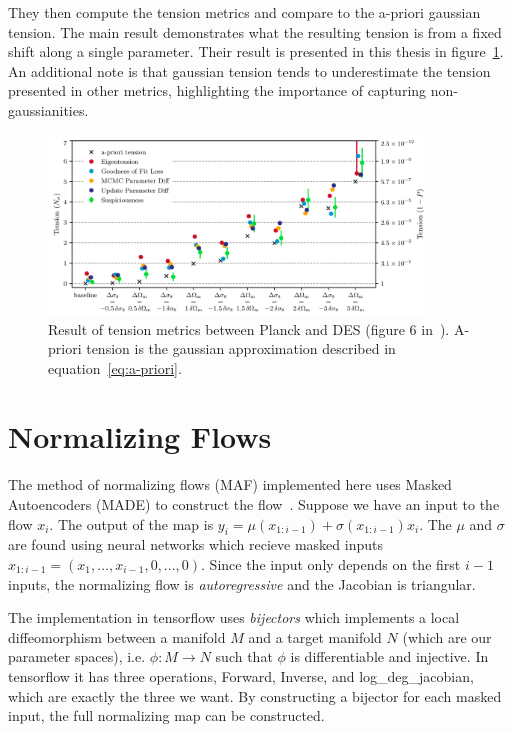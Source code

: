 They then compute the tension metrics and compare to the a-priori gaussian tension. The main result demonstrates what the resulting tension is from a fixed shift along a single parameter. Their result is presented in this thesis in figure~\ref{fig:planck_des_tension}. An additional note is that gaussian tension tends to underestimate the tension presented in other metrics, highlighting the importance of capturing non-gaussianities.
\begin{figure}[tb]
	\centering
	\includegraphics[width=0.9\textwidth]{plots/planck_des_result.png}
	\caption{Result of tension metrics between Planck and DES (figure 6 in~\cite{lemos_assessing_2021}). A-priori tension is the gaussian approximation described in equation~\ref{eq:a-priori}.}
	\label{fig:planck_des_tension}
\end{figure}
\section{Normalizing Flows}
The method of normalizing flows (MAF) implemented here uses Masked Autoencoders (MADE) to construct the flow~\cite{germain_made_2015,papamakarios_masked_2018,raveri_non-gaussian_2021}. 
Suppose we have an input to the flow $x_i$. 
The output of the map is $y_i= \mu(x_{1:i-1})+\sigma(x_{1:i-1})x_i$. 
The $\mu$ and $\sigma$ are found using neural networks which recieve masked inputs $x_{1:i-1}=(x_1,\ldots,x_{i-1},0,\ldots,0)$. 
Since the input only depends on the first $i-1$ inputs, the normalizing flow is \textit{autoregressive} and the Jacobian is triangular.

The implementation in tensorflow uses \textit{bijectors} which implements a local diffeomorphism between a manifold $M$ and a target manifold $N$ (which are our parameter spaces), i.e. $\phi:M\rightarrow N$ such that $\phi$ is differentiable and injective. 
In tensorflow it has three operations, Forward, Inverse, and log\_deg\_jacobian, which are exactly the three we want. 
By constructing a bijector for each masked input, the full normalizing map can be constructed.

